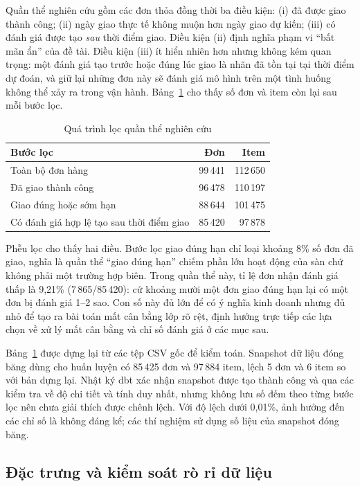 Quần thể nghiên cứu gồm các đơn thỏa đồng thời ba điều kiện: (i) đã được giao thành công; (ii) ngày giao thực tế không muộn hơn ngày giao dự kiến; (iii) có đánh giá được tạo \emph{sau} thời điểm giao. Điều kiện (ii) định nghĩa phạm vi ``bất mãn ẩn'' của đề tài. Điều kiện (iii) ít hiển nhiên hơn nhưng không kém quan trọng: một đánh giá tạo trước hoặc đúng lúc giao là nhãn đã tồn tại tại thời điểm dự đoán, và giữ lại những đơn này sẽ đánh giá mô hình trên một tình huống không thể xảy ra trong vận hành. Bảng~\ref{tab:funnel} cho thấy số đơn và item còn lại sau mỗi bước lọc.

\begin{table}[htbp]\centering\small
\caption{Quá trình lọc quần thể nghiên cứu}\label{tab:funnel}
\begin{tabular}{lrr}
\toprule
Bước lọc & Đơn & Item \\
\midrule
Toàn bộ đơn hàng                          & 99\,441 & 112\,650 \\
Đã giao thành công                        & 96\,478 & 110\,197 \\
Giao đúng hoặc sớm hạn                    & 88\,644 & 101\,475 \\
Có đánh giá hợp lệ tạo sau thời điểm giao & 85\,420 &  97\,878 \\
\bottomrule
\end{tabular}
\end{table}

Phễu lọc cho thấy hai điều. Bước lọc giao đúng hạn chỉ loại khoảng 8\% số đơn đã giao, nghĩa là quần thể ``giao đúng hạn'' chiếm phần lớn hoạt động của sàn chứ không phải một trường hợp biên. Trong quần thể này, tỉ lệ đơn nhận đánh giá thấp là 9,21\% (7\,865/85\,420): cứ khoảng mười một đơn giao đúng hạn lại có một đơn bị đánh giá 1--2 sao. Con số này đủ lớn để có ý nghĩa kinh doanh nhưng đủ nhỏ để tạo ra bài toán mất cân bằng lớp rõ rệt, định hướng trực tiếp các lựa chọn về xử lý mất cân bằng và chỉ số đánh giá ở các mục sau.

Bảng~\ref{tab:funnel} được dựng lại từ các tệp CSV gốc để kiểm toán. Snapshot dữ liệu đóng băng dùng cho huấn luyện có 85\,425 đơn và 97\,884 item, lệch 5 đơn và 6 item so với bản dựng lại. Nhật ký dbt xác nhận snapshot được tạo thành công và qua các kiểm tra về độ chi tiết và tính duy nhất, nhưng không lưu số đếm theo từng bước lọc nên chưa giải thích được chênh lệch. Với độ lệch dưới 0,01\%, ảnh hưởng đến các chỉ số là không đáng kể; các thí nghiệm sử dụng số liệu của snapshot đóng băng.

\subsection{Đặc trưng và kiểm soát rò rỉ dữ liệu}

